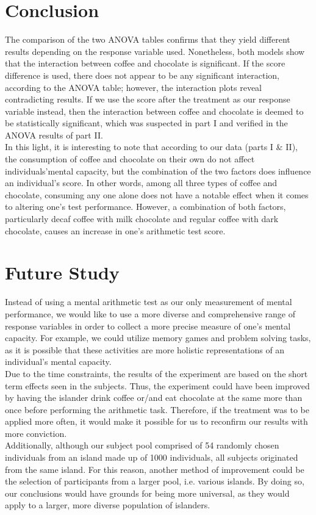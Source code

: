 \documentclass[12pt]{article}
\begin{document}
\begin{flushleft}
\section{Conclusion}
\bigskip
The comparison of the two ANOVA tables confirms that they yield different results depending on the response variable used. Nonetheless, both models show that the interaction between coffee and chocolate is significant. If the score difference is used, there does not appear to be any significant interaction, according to the ANOVA table; however, the interaction plots reveal contradicting results. If we use the score after the treatment as our response variable instead, then the interaction between coffee and chocolate is deemed to be statistically significant, which was suspected in part I and verified in the ANOVA results of part II. 
\bigskip
\\ In this light, it is interesting to note that according to our data (parts I \& II), the consumption of coffee and chocolate on their own do not affect individuals\rq\space mental capacity, but the combination of the two factors does influence an individual\rq s score. In other words, among all three types of coffee and chocolate, consuming any one alone does not have a notable effect when it comes to altering one\rq s test performance. However, a combination of both factors, particularly decaf coffee with milk chocolate and regular coffee with dark chocolate, causes an increase in one\rq s arithmetic test score.
\bigskip
\section{Future Study}
\bigskip
Instead of using a mental arithmetic test as our only measurement of mental performance, we would like to use a more diverse and comprehensive range of response variables in order to collect a more precise measure of one\rq s mental capacity. For example, we could utilize memory games and problem solving tasks, as it is possible that these activities are more holistic representations of an individual’s mental capacity. 
\bigskip
\\ Due to the time constraints, the results of the experiment are based on the short term effects seen in the subjects. Thus, the experiment could have been improved by having the islander drink coffee or/and eat chocolate at the same more than once before performing the arithmetic task. Therefore, if the treatment was to be applied more often, it would make it possible for us to reconfirm our results with more conviction.
\bigskip
\\ Additionally, although our subject pool comprised of 54 randomly chosen individuals from an island made up of 1000 individuals, all subjects originated from the same island. For this reason, another method of improvement could be the selection of participants from a larger pool, i.e. various islands. By doing so, our conclusions would have grounds for being more universal, as they would apply to a larger, more diverse population of islanders.     
\newpage

\end{flushleft}
\end{document}
